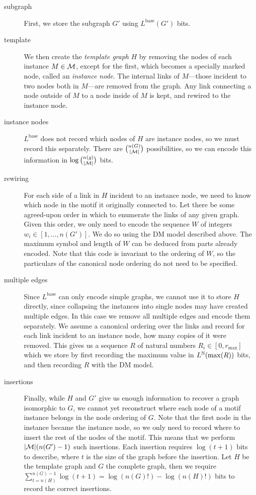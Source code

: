 \begin{description}
\item[subgraph] First, we store the subgraph $G'$ using $L^\text{base}(G')$ bits.
\item[template] We then create the \emph{template graph} $H$ by removing the nodes of each instance $M \in \cal M$, except for the first, which becomes a specially marked node, called an \emph{instance node}. The internal links of $M$---those incident to two nodes both in $M$---are removed from the graph. Any link connecting a node outside of $M$ to a node inside of $M$ is kept, and rewired to the instance node.
\item[instance nodes] $L^\text{base}$ does not record which nodes of $H$ are instance nodes, so we must record this separately. There are $n(G) \choose |{\cal M}|$ possibilities, so we can encode this information in $\log {n(g) \choose |{\cal M}|}$ bits.
\item[rewiring] For each side of a link in $H$ incident to an instance node, we need to know which node in the motif it originally connected to. Let there be some agreed-upon order in which to enumerate the links of any given graph. Given this order, we only need to encode the sequence $W$ of integers $w_i \in [1,\ldots, n(G')]$. We do so using the DM model described above. The maximum symbol and length of $W$ can be deduced from parts already encoded. Note that this code is invariant to the ordering of $W$, so the particulars of the canonical node ordering do not need to be specified.
\item[multiple edges] Since $L^\text{base}$ can only encode simple graphs, we cannot use it to store $H$ directly, since collapsing the instances into single nodes may have created multiple edges. In this case we remove all multiple edges and encode them separately. We assume a canonical ordering over the links and record for each link incident to an instance node, how many copies of it were removed. This gives us a sequence $R$ of natural numbers $R_i \in [0, r_\text{max}]$ which we store by first recording the maximum value in $L^{\mathbb N}(\max(R))$ bits, and then recording $R$ with the DM model.
\item[insertions] Finally, while $H$ and $G'$ give us enough information to recover a graph isomorphic to $G$, we cannot yet reconstruct where each node of a motif instance belongs in the node ordering of $G$. Note that the first node in the instance became the instance node, so we only need to record where to insert the rest of the nodes of the motif. This means that we perform $|{\cal M}| (n(G')-1)$ such insertions. Each insertion requires $\log (t+1)$ bits to describe, where $t$ is the size of the graph before the insertion. Let $H$ be the template graph and $G$ the complete graph, then we require $\sum_{t=n(H)}^{n(G)-1} \log (t+1) = \log (n(G)!) - \log (n(H)!)$ bits to record the correct insertions.
\end{description} 

